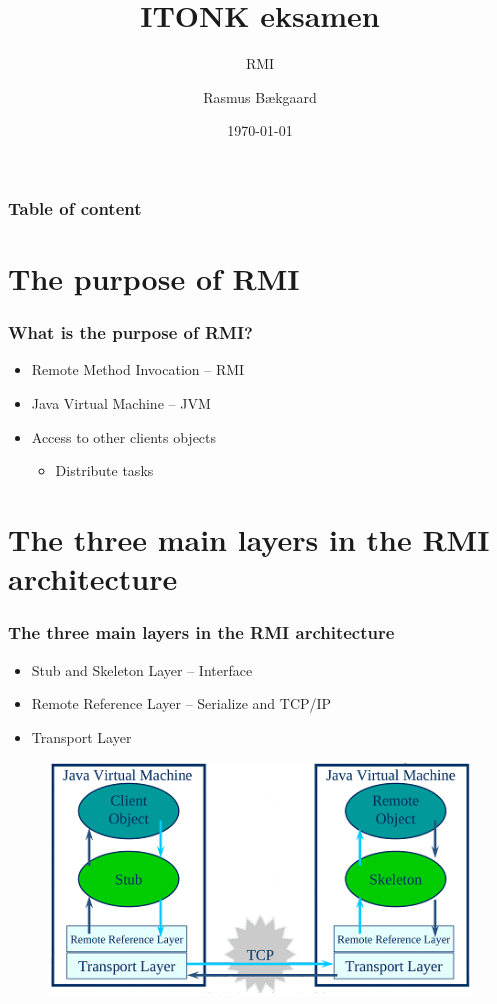 \documentclass{beamer}
\title{ITONK eksamen}
\subtitle{RMI}
\author %
{Rasmus Bækgaard\inst{1}}
\institute%
{
  \inst{1}%
  Information og Kommunikationsteknologi\\
  Ingeniørhøjskolen i Aarhus
}
\date{\today}
\begin{document}
	\frame{\titlepage}
	
	\begin{frame}
		\frametitle{Table of content}
		\tableofcontents%
	\end{frame}

\section{The purpose of RMI}
	\begin{frame}
		\frametitle{What is the purpose of RMI?}
		
		\begin{itemize}
		\item Remote Method Invocation -- RMI
		\item Java Virtual Machine -- JVM
		\item Access to other clients objects
		
			\begin{itemize}
			\item Distribute tasks
			\end{itemize}
		\end{itemize}
			
	\end{frame}
	
	
	
\section{The three main layers in the RMI architecture}
	\begin{frame}
		\frametitle{The three main layers in the RMI architecture}
		
		\begin{itemize}
		\item Stub and Skeleton Layer -- Interface
		\item Remote Reference Layer -- Serialize and TCP/IP
		\item Transport Layer
		\end{itemize}
		
		\begin{figure}[hbtp]
		\centering
		\includegraphics[scale=0.7]{JVM}
		\end{figure}		

				
	\end{frame}
		
\end{document}
